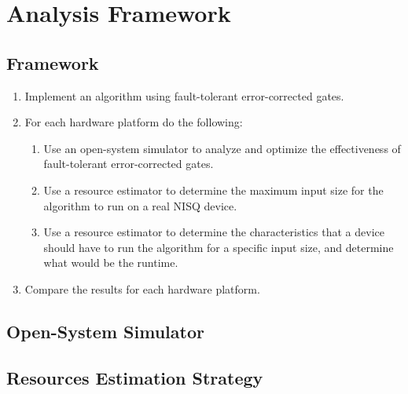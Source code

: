 %
%
\chapter {Analysis Framework}

\section{Framework}



\begin{enumerate}
    \item Implement an algorithm using fault-tolerant error-corrected gates.
    \item For each hardware platform do the following:
    \begin{enumerate}
        \item Use an open-system simulator to analyze and optimize the effectiveness of fault-tolerant error-corrected gates.
        \item Use a resource estimator to determine the maximum input size for the algorithm to run on a real NISQ device.
        \item Use a resource estimator to determine the characteristics that a device should have to run the algorithm for a specific input size, and determine what would be the runtime.
    \end{enumerate}
    \item Compare the results for each hardware platform.
\end{enumerate}



\section{Open-System Simulator}


\section{Resources Estimation Strategy}

